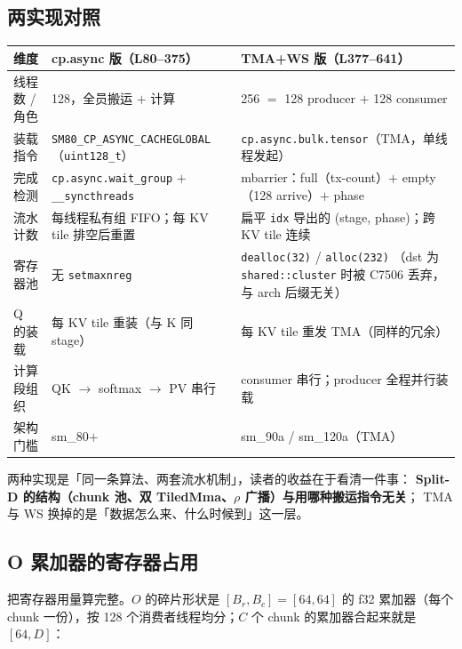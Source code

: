 \subsection{两实现对照}

\begin{center}
\begin{tabular}{p{3.4cm}p{4.6cm}p{5.2cm}}
\toprule
维度 & cp.async 版（L80--375） & TMA+WS 版（L377--641） \\
\midrule
线程数 / 角色 & 128，全员搬运 $+$ 计算 & 256 $=$ 128 producer $+$ 128 consumer \\
装载指令 & \texttt{SM80\_CP\_}\allowbreak\texttt{ASYNC\_}\allowbreak\texttt{CACHEGLOBAL}（\texttt{uint128\_t}） &
  \texttt{cp.async.}\allowbreak\texttt{bulk.}\allowbreak\texttt{tensor}（TMA，单线程发起） \\
完成检测 & \texttt{cp.\allowbreak{}async.\allowbreak{}wait\_\allowbreak{}group} $+$ \texttt{\_\allowbreak{}\_\allowbreak{}syncthreads} &
  mbarrier：full（tx-count）$+$ empty（128 arrive）$+$ phase \\
流水计数 & 每线程私有组 FIFO；每 KV tile 排空后重置 &
  扁平 \texttt{idx} 导出的 (stage, phase)；跨 KV tile 连续 \\
寄存器池 & 无 \texttt{setmaxnreg} & \texttt{dealloc(32)} / \texttt{alloc(232)}
  （dst 为 \texttt{shared::cluster} 时被 C7506 丢弃，与 arch 后缀无关） \\
Q 的装载 & 每 KV tile 重装（与 K 同 stage） & 每 KV tile 重发 TMA（同样的冗余） \\
计算段组织 & QK $\to$ softmax $\to$ PV 串行 & consumer 串行；producer 全程并行装载 \\
架构门槛 & sm\_80$+$ & sm\_90a / sm\_120a（TMA） \\
\bottomrule
\end{tabular}
\end{center}

两种实现是「同一条算法、两套流水机制」，读者的收益在于看清一件事：
\textbf{Split-D 的结构（chunk 池、双 TiledMma、$\rho$ 广播）与用哪种搬运指令无关}；
TMA 与 WS 换掉的是「数据怎么来、什么时候到」这一层。

\subsection{O 累加器的寄存器占用}

把寄存器用量算完整。$O$ 的碎片形状是 $[B_r, B_c] = [64,64]$ 的 f32 累加器（每个 chunk
一份），按 128 个消费者线程均分；$C$ 个 chunk 的累加器合起来就是 $[64, D]$：

